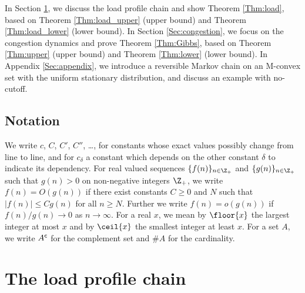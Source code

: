 \documentclass[12pt, reqno]{amsart}
\begin{document}
In Section \ref{Sec:load},
we discuss the load profile chain and show Theorem \ref{Thm:load}, based on Theorem \ref{Thm:load_upper} (upper bound) and Theorem \ref{Thm:load_lower} (lower bound).
In Section \ref{Sec:congestion},
we focus on the congestion dynamics and prove Theorem \ref{Thm:Gibbs},
based on Theorem \ref{Thm:upper} (upper bound) and Theorem \ref{Thm:lower} (lower bound).
In Appendix \ref{Sec:appendix}, we introduce a reversible Markov chain on an M-convex set with the uniform stationary distribution, and discuss
an example with no-cutoff.

\subsection*{Notation}
We write $c$, $C$, $C'$, $C''$, \dots, for constants whose exact values possibly change from line to line,
and for $c_\delta$ a constant which depends on the other constant $\delta$ to indicate its dependency.
For real valued sequences $\{f(n)\}_{n \in \Z_+}$ and $\{g(n)\}_{n\in \Z_+}$ such that $g(n)>0$ on non-negative integers $\Z_+$,
we write $f(n)=O(g(n))$
if there exist constants $C\ge 0$ and $N$ such that
$|f(n)| \le C g(n)$ for all $n \ge N$.
Further we write $f(n)=o(g(n))$ if $f(n)/g(n) \to 0$ as $n \to \infty$.
For a real $x$, 
we mean by $\floor{x}$ the largest integer at most $x$ and by $\ceil{x}$ the smallest integer at least $x$.
For a set $A$, we write $A^{\sf c}$ for the complement set and $\#A$ for the cardinality.



\section{The load profile chain}\label{Sec:load}
\end{document}
